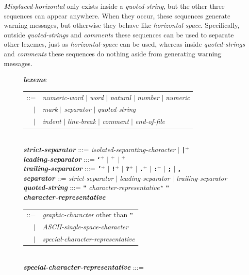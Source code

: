 \documentclass[12pt]{article}
\newcommand{\TT}[1]{{\tt \bfseries #1}}
\newcommand{\STAR}{{\Large $^\star$}}
\newcommand{\PLUS}[1][]{{$^{+#1}$}}
\newcommand{\emkey}[1]{{\em \bfseries #1}}
\newlength{\figurewidth}
\newenvironment{boxedfigure}[1][!btp]%
	{\begin{figure}[#1]
	 \begin{lrbox}{\figurebox}
	 \begin{minipage}{\figurewidth}

	 \vspace*{1ex}}%
	{
	 \vspace*{1ex}

	 \end{minipage}
	 \end{lrbox}

	 \centering
	 \fbox{\hspace*{0.1in}\usebox{\figurebox}\hspace*{0.1in}}
	 \end{figure}}
\begin{document}
{\em Misplaced-horizontal} only exists inside a {\em quoted-string},
but the other three sequences can appear anywhere.  When they occur,
these sequences generate warning messages, but otherwise they behave
like {\em horizontal-space}.  Specifically, outside {\em quoted-strings}
and {\em comments} these sequences can be used to separate other lexemes,
just as {\em horizontal-space} can be used,
whereas inside {\em quoted-strings} and
{\em comments} these sequences do nothing aside from generating
warning messages.

\begin{boxedfigure}[!p]

\emkey{lexeme}
        \begin{tabular}[t]{rl}
	::= & {\em numeric-word} $|$ {\em word} $|$
	      {\em natural} $|$ {\em number} $|$ {\em numeric} \\
	$|$ & {\em mark} $|$ {\em separator} $|$ {\em quoted-string} \\
	$|$ & {\em indent} $|$ {\em line-break} $|$
	      {\em comment} $|$ {\em end-of-file}
	\end{tabular}
\label{LEXEME}
\\[1ex]
\emkey{strict-separator} :::= {\em isolated-separating-character} $|$
                              \TT{|}\PLUS{}
\\[0.5ex]
\emkey{leading-separator} :::=
	\TT{`}\PLUS{} $|$
	\TT{\textexclamdown}\PLUS{} $|$ \TT{\textquestiondown}\PLUS{}
\\[0.5ex]
\emkey{trailing-separator} :::= \TT{'}\PLUS{} $|$
				   \TT{!}\PLUS{} $|$
				   \TT{?}\PLUS{} $|$
				   \TT{.}\PLUS{} $|$
				   \TT{:}\PLUS{} $|$
				   \TT{;} $|$
				   \TT{,}
\\[0.5ex]
\emkey{separator}
    ::= {\em strict-separator}
    $|$ {\em leading-separator}
    $|$ {\em trailing-separator}
\\[1ex]
\emkey{quoted-string}\label{QUOTED-STRING} :::=
    \TT{"} {\em character-representative}\,\STAR{} \TT{"}
\\[0.3ex]
\emkey{character-representative}\label{CHARACTER-REPRESENTATIVE}
	\begin{tabular}[t]{@{}rl@{}}
	::= & {\em graphic-character} other than \TT{"} \\
	$|$ & {\em ASCII-single-space-character} \\
	$|$ & {\em special-character-representative} \\
	\end{tabular}
\\[0.3ex]
\emkey{special-character-representative} :::=

\end{boxedfigure}
\end{document}
